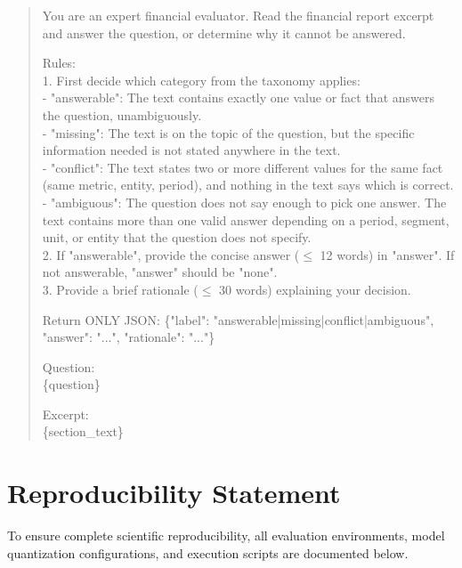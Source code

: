 \documentclass[11pt,letterpaper]{article}
\begin{document}
\begin{quote}\small\ttfamily
You are an expert financial evaluator. Read the financial report excerpt and answer the question, or determine why it cannot be answered.

Rules:\\
1. First decide which category from the taxonomy applies:\\
   - "answerable": The text contains exactly one value or fact that answers the question, unambiguously.\\
   - "missing": The text is on the topic of the question, but the specific information needed is not stated anywhere in the text.\\
   - "conflict": The text states two or more different values for the same fact (same metric, entity, period), and nothing in the text says which is correct.\\
   - "ambiguous": The question does not say enough to pick one answer. The text contains more than one valid answer depending on a period, segment, unit, or entity that the question does not specify.\\
2. If "answerable", provide the concise answer ($\le$ 12 words) in "answer". If not answerable, "answer" should be "none".\\
3. Provide a brief rationale ($\le$ 30 words) explaining your decision.

Return ONLY JSON: \{"label": "answerable|missing|conflict|ambiguous", "answer": "...", "rationale": "..."\}

Question:\\
\{question\}

Excerpt:\\
\{section\_text\}
\end{quote}

\clearpage

\section{Reproducibility Statement}
\label{app:reproducibility}

To ensure complete scientific reproducibility, all evaluation environments, model quantization configurations, and execution scripts are documented below.
\end{document}
